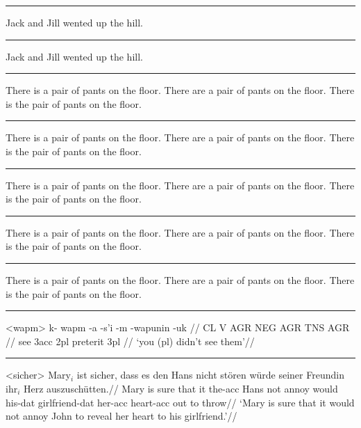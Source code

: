 \documentclass[12pt]{article}
\begin{document}
\begingroup
{}
\endgroup
\bigskip

\filbreak\hrule\medskip

\begingroup
\ex *Jack and Jill wented up the hill.\xe
\endgroup
\bigskip

\filbreak\hrule\medskip

\begingroup
\ex \judge* Jack and Jill wented up the hill.\xe
\endgroup
\bigskip

\filbreak\hrule\medskip

\begingroup
\pex
\a There is a pair of pants on the floor.
\a {}There are a pair of pants on the floor.
\a \judge*There is the pair of pants on the floor.
\xe
\endgroup
\bigskip

\filbreak\hrule\medskip

\begingroup
\pex
\a There is a pair of pants on the floor.
\a {}There are a pair of pants on the floor.
\a \ljudge*There is the pair of pants on the floor.
\xe
\endgroup
\bigskip

\filbreak\hrule\medskip

\begingroup
\pex[*=?*]
\a There is a pair of pants on the floor.
\a {}There are a pair of pants on the floor.
\a \ljudge*There is the pair of pants on the floor.
\xe
\endgroup
\bigskip

\filbreak\hrule\medskip

\begingroup
\pex[*]
\a There is a pair of pants on the floor.
\a \ljudge* There are a pair of pants on the floor.
\a \ljudge* There is the pair of pants on the floor.
\xe
\endgroup
\bigskip

\filbreak\hrule\medskip

\begingroup
\pex[textoffset=!.7em]
\a There is a pair of pants on the floor.
\a {} There are a pair of pants on the floor.
\a \ljudge* There is the pair of pants on the floor.
\xe
\endgroup
\bigskip

\filbreak\hrule\medskip

\begingroup
\ex<wapm>
\begingl
\gla k- wapm -a -s'i -m -wapunin -uk //
\glb CL V AGR NEG AGR TNS AGR //
 see {\sc 3acc} {} {\sc 2pl} preterit {\sc 3pl} //
\glft `you (pl) didn't see them'//
\endgl
\xe
\endgroup
\bigskip

\filbreak\hrule\medskip

\begingroup
\ex<sicher>
\begingl
\gla Mary$_i$ ist sicher, dass es den Hans nicht st\"oren w\"urde
seiner Freundin ihr$_i$ Herz auszusch\"utten.//
\glb Mary is sure that it the-{\sc acc} Hans not annoy would
his-{\sc dat} girlfriend-{\sc dat} her-{\sc acc} heart-{\sc acc} {out to
throw}//
\glft  `Mary is sure that it would not annoy John to reveal her
heart to his girlfriend.'//
\endgl
\xe
\endgroup
\bigskip
\end{document}
